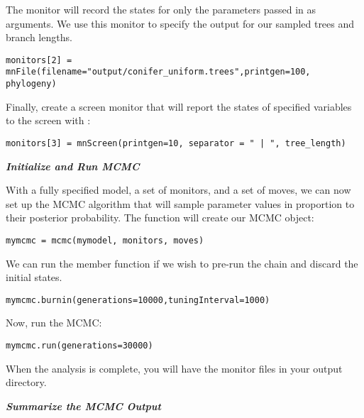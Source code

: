 The  monitor will record the states for only the parameters passed in as arguments. We use this monitor to specify the output for our sampled trees and branch lengths.

{\tt \begin{snugshade*}
\begin{lstlisting}
monitors[2] = mnFile(filename="output/conifer_uniform.trees",printgen=100, phylogeny)
\end{lstlisting}
\end{snugshade*}}


Finally, create a screen monitor that will report the states of specified variables to the screen with :
{\tt \begin{snugshade*}
\begin{lstlisting}
monitors[3] = mnScreen(printgen=10, separator = " | ", tree_length)
\end{lstlisting}
\end{snugshade*}}

\textbf{\textit{Initialize and Run MCMC}}

With a fully specified model, a set of monitors, and a set of moves, we can now set up the MCMC algorithm that will sample parameter values in proportion to their posterior probability. The  function will create our MCMC object:
{\tt \begin{snugshade*}
\begin{lstlisting}
mymcmc = mcmc(mymodel, monitors, moves)
\end{lstlisting}
\end{snugshade*}}


We can run the  member function if we wish to pre-run the chain and discard the initial states. 
{\tt \begin{snugshade*}
\begin{lstlisting}
mymcmc.burnin(generations=10000,tuningInterval=1000)
\end{lstlisting}
\end{snugshade*}}


Now, run the MCMC:
{\tt \begin{snugshade*}
\begin{lstlisting}
mymcmc.run(generations=30000)
\end{lstlisting}
\end{snugshade*}}

When the analysis is complete, you will have the monitor files in your output directory.


\textbf{\textit{Summarize the MCMC Output}}

